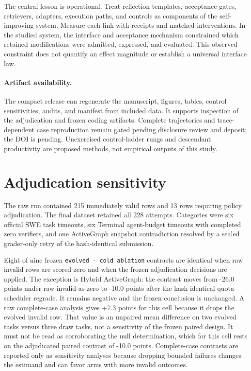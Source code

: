\documentclass[10pt,twocolumn]{article}
\begin{document}
The central lesson is operational. Treat reflection templates,
acceptance gates, retrievers, adapters, execution paths, and controls as
components of the self-improving system. Measure each link with receipts
and matched interventions. In the studied system, the interface and
acceptance mechanism constrained which retained modifications were
admitted, expressed, and evaluated. This observed constraint does not
quantify an effect magnitude or establish a universal interface law.

\paragraph{Artifact availability.} The compact release can regenerate the manuscript, figures, tables, control sensitivities, audits, and manifest from included data. It supports inspection of the adjudication and frozen coding artifacts. Complete trajectories and trace-dependent case reproduction remain gated pending disclosure review and deposit; the DOI is pending. Unexercised control-ladder rungs and descendant productivity are proposed methods, not empirical outputs of this study.

\clearpage
\balance


\clearpage
\nobalance
\appendix

\section{Adjudication sensitivity}\label{a.-adjudication-sensitivity}

The raw run contained 215 immediately valid rows and 13 rows requiring
policy adjudication. The final dataset retained all 228 attempts.
Categories were six official SWE task timeouts, six Terminal
agent-budget timeouts with completed zero verifiers, and one ActiveGraph
snapshot contradiction resolved by a sealed grader-only retry of the
hash-identical submission.

Eight of nine frozen \texttt{evolved\ -\ cold\ ablation} contrasts are
identical when raw invalid rows are scored zero and when the frozen
adjudication decisions are applied. The exception is Hybrid ActiveGraph:
the contrast moves from -26.0 points under raw-invalid-as-zero to -10.0
points after the hash-identical quota-scheduler regrade. It remains
negative and the frozen conclusion is unchanged. A raw complete-case
analysis gives +7.3 points for this cell because it drops the evolved
invalid row. That value is an unpaired mean difference on two evolved
tasks versus three draw tasks, not a sensitivity of the frozen paired
design. It must not be read as corroborating the null determination,
which for this cell rests on the adjudicated paired contrast of -10.0
points. Complete-case contrasts are reported only as sensitivity
analyses because dropping bounded failures changes the estimand and can
favor arms with more invalid outcomes.
\end{document}
